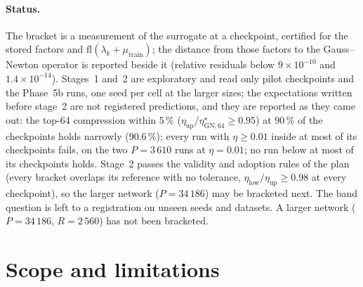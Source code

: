 \documentclass[11pt]{article}
\theoremstyle{remark}
\begin{document}
\paragraph{Status.} The bracket is a measurement of the surrogate at a checkpoint, certified for the stored factors and $\mathrm{fl}(\lambda_k+\mu_{\mathrm{train}})$; the distance from those factors to the Gauss--Newton operator is reported beside it (relative residuals below $9\times10^{-10}$ and $1.4\times10^{-14}$). Stages~1 and~2 are exploratory and read only pilot checkpoints and the Phase~5b runs, one seed per cell at the larger sizes; the expectations written before stage~2 are not registered predictions, and they are reported as they came out: the top-$64$ compression within $5\,\%$ ($\eta_{\mathrm{up}}/\eta^\star_{\mathrm{GN},64}\ge0.95$) at $90\,\%$ of the checkpoints holds narrowly ($90.6\,\%$); every run with $\eta\ge0.01$ inside at most of its checkpoints fails, on the two $P=3\,610$ runs at $\eta=0.01$; no run below at most of its checkpoints holds. Stage~2 passes the validity and adoption rules of the plan (every bracket overlaps its reference with no tolerance, $\eta_{\mathrm{low}}/\eta_{\mathrm{up}}\ge0.98$ at every checkpoint), so the larger network ($P=34\,186$) may be bracketed next. The band question is left to a registration on unseen seeds and datasets. A larger network ($P=34\,186$, $R=2\,560$) has not been bracketed.


\clearpage
\section{Scope and limitations}\label{sec:limits}
\end{document}
